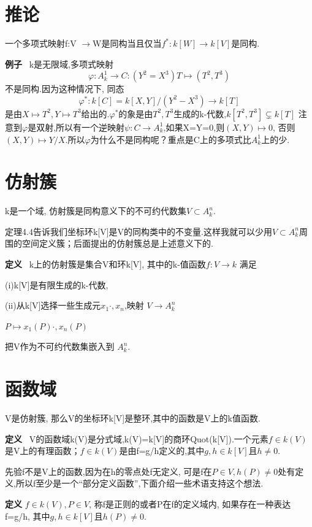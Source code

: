 \documentclass[UTF8]{book}
\begin{document}
\section{推论}一个多项式映射f:V $\rightarrow $W是同构当且仅当$f^{*}:k[W]\rightarrow k[V]$是同构.

\textbf{例子} \ k是无限域,多项式映射
\begin{equation*}
\varphi:A^{1}_{k}\rightarrow C:(Y^{2}=X^{3})  T\mapsto (T^{2},T^{3})
\end{equation*}
不是同构.因为这种情况下, 同态
\begin{equation*}
\varphi^{*}:k[C]=k[X,Y]/(Y^{2}-X^{3})\rightarrow k[T]
\end{equation*}
是由$X\mapsto T^{2},Y\mapsto T^{3}$给出的.$\varphi^{*}$的象是由$T^{2},T^{3}$生成的k-代数,$k[T^{2},T^{3}]\subsetneq k[T]$
注意到$\varphi$是双射,所以有一个逆映射$\psi :C\rightarrow A^{1}_{k}$,如果X=Y=0,则$(X,Y)\mapsto 0$, 否则$(X,Y)\mapsto Y/X$.所以$\varphi$为什么不是同构呢？重点是C上的多项式比$A^{1}_{k}$上的少.
\section{仿射簇}
k是一个域, 仿射簇是同构意义下的不可约代数集$V\subset A^{n}_{k}$.

定理4.4告诉我们坐标环k[V]是V的同构类中的不变量.这样我就可以少用$V\subset A^{n}_{k}$周围的空间定义簇；后面提出的仿射簇总是上述意义下的.

\textbf{定义} \ k上的仿射簇是集合V和环k[V], 其中的k-值函数$f:V\rightarrow k$ 满足

(i)k[V]是有限生成的k-代数,

(ii)从k[V]选择一些生成元$x_{1}  \cdot, x_{n}$,映射
\center $ V \rightarrow  A^{n}_{k}$


$P\mapsto x_{1}(P)  \cdot, x_{n}(P)$

\justifying
把V作为不可约代数集嵌入到 $A^{n}_{k}$.
\section{函数域}V是仿射簇, 那么V的坐标环k[V]是整环,其中的函数是V上的k值函数.

\textbf{定义} \ V的函数域k(V)是分式域,k(V)=k[V]的商环Quot(k[V]).一个元素$f\in k(V)$是V上的有理函数；$f\in k(V)$是由f=g/h定义的,其中$g,h\in k[V]$且$h\neq 0$.

先验f不是V上的函数,因为在h的零点处f无定义, 可是f在$P\in V,h(P)\neq 0$处有定义,所以f至少是一个“部分定义函数”,下面介绍一些术语支持这个想法.

\textbf{定义} $f\in k(V),P\in V$, 称f是正则的或者P在f的定义域内, 如果存在一种表达f=g/h, 其中$g,h\in k[V]$且$h(P)\neq 0$.
\end{document}
